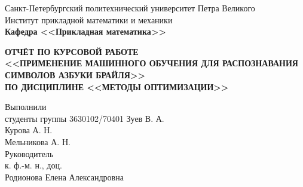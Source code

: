 \documentclass[main.tex]{subfiles}
\begin{document}
\begin{titlepage}
\begin{center}
	\begin{large}
		Санкт-Петербургский политехнический университет Петра Великого\\
		Институт прикладной математики и механики\\
		\textbf{Кафедра <<Прикладная математика>>}\\
	\end{large}
	\vfill
	\Large{\textbf{ОТЧЁТ ПО КУРСОВОЙ РАБОТЕ\\
	<<ПРИМЕНЕНИЕ МАШИННОГО ОБУЧЕНИЯ ДЛЯ РАСПОЗНАВАНИЯ СИМВОЛОВ АЗБУКИ БРАЙЛЯ>>\\
	ПО ДИСЦИПЛИНЕ <<МЕТОДЫ ОПТИМИЗАЦИИ>>}}
\end{center}
\vfill
\flushleft
Выполнили\\
студенты группы 3630102/70401
\flushright
Зуев В. А.\\
Курова А. Н.\\
Мельникова А. Н.\\
\flushleft
Руководитель\\
к. ф.-м. н., доц.\\
\flushright
Родионова Елена Александровна
\vfill
{}
\end{titlepage}
\end{document}
